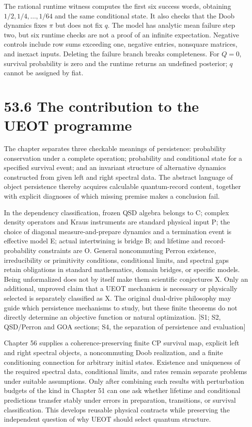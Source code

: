 \documentclass[
  11pt,
  oneside]{book}
\begin{document}
The rational runtime witness computes the first six success words,
obtaining \(1/2,1/4,\ldots,1/64\) and the same conditional state. It
also checks that the Doob dynamics fixes \(\pi\) but does not fix \(q\).
The model has analytic mean failure step two, but six runtime checks are
not a proof of an infinite expectation. Negative controls include row
sums exceeding one, negative entries, nonsquare matrices, and inexact
inputs. Deleting the failure branch breaks completeness. For \(Q=0\),
survival probability is zero and the runtime returns an undefined
posterior; \(q\) cannot be assigned by fiat.

\section{53.6 The contribution to the UEOT programme}

The chapter separates three checkable meanings of persistence:
probability conservation under a complete operation; probability and
conditional state for a specified survival event; and an invariant
structure of alternative dynamics constructed from given left and right
spectral data. The abstract language of object persistence thereby
acquires calculable quantum-record content, together with explicit
diagnoses of which missing premise makes a conclusion fail.

In the dependency classification, frozen QSD algebra belongs to C;
complex density operators and Kraus instruments are standard physical
input P; the choice of diagonal measure-and-prepare dynamics and a
termination event is effective model E; actual intertwining is bridge B;
and lifetime and record-probability constraints are O. General
noncommuting Perron existence, irreducibility or primitivity conditions,
conditional limits, and spectral gaps retain obligations in standard
mathematics, domain bridges, or specific models. Being unformalized does
not by itself make them scientific conjectures X. Only an additional,
unproved claim that a UEOT mechanism is necessary or physically selected
is separately classified as X. The original dual-drive philosophy may
guide which persistence mechanisms to study, but these finite theorems
do not directly determine an objective function or natural optimization.
{[}S1; S2, QSD/Perron and GOA sections; S4, the separation of
persistence and evaluation{]}

Chapter 56 supplies a coherence-preserving finite CP survival map,
explicit left and right spectral objects, a noncommuting Doob
realization, and a finite conditioning connection for arbitrary initial
states. Existence and uniqueness of the required spectral data,
conditional limits, and rates remain separate problems under suitable
assumptions. Only after combining such results with perturbation budgets
of the kind in Chapter 51 can one ask whether lifetime and conditional
predictions transfer stably under errors in preparation, transitions, or
survival classification. This develops reusable physical contracts while
preserving the independent question of why UEOT should select quantum
structure.
\end{document}
